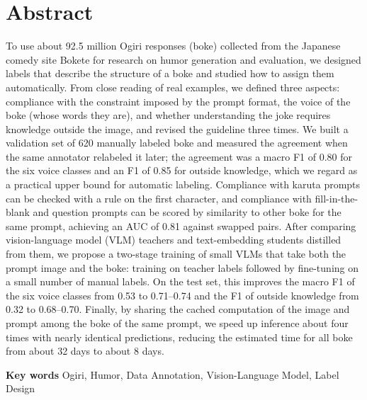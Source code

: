 \section*{Abstract}
To use about 92.5 million Ogiri responses (boke) collected from the Japanese comedy site Bokete for research on humor generation and evaluation, we designed labels that describe the structure of a boke and studied how to assign them automatically.
From close reading of real examples, we defined three aspects: compliance with the constraint imposed by the prompt format, the voice of the boke (whose words they are), and whether understanding the joke requires knowledge outside the image, and revised the guideline three times.
We built a validation set of 620 manually labeled boke and measured the agreement when the same annotator relabeled it later; the agreement was a macro F1 of 0.80 for the six voice classes and an F1 of 0.85 for outside knowledge, which we regard as a practical upper bound for automatic labeling.
Compliance with karuta prompts can be checked with a rule on the first character, and compliance with fill-in-the-blank and question prompts can be scored by similarity to other boke for the same prompt, achieving an AUC of 0.81 against swapped pairs.
After comparing vision-language model (VLM) teachers and text-embedding students distilled from them, we propose a two-stage training of small VLMs that take both the prompt image and the boke: training on teacher labels followed by fine-tuning on a small number of manual labels.
On the test set, this improves the macro F1 of the six voice classes from 0.53 to 0.71--0.74 and the F1 of outside knowledge from 0.32 to 0.68--0.70.
Finally, by sharing the cached computation of the image and prompt among the boke of the same prompt, we speed up inference about four times with nearly identical predictions, reducing the estimated time for all boke from about 32 days to about 8 days.
\par
\noindent
{\bf Key words} Ogiri, Humor, Data Annotation, Vision-Language Model, Label Design
